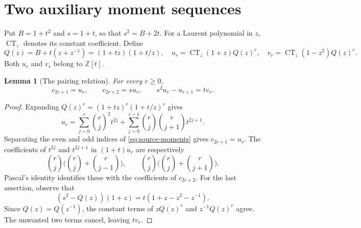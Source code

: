 \documentclass[11pt]{article}
\newtheorem{lemma}[theorem]{Lemma}
\theoremstyle{definition}
\theoremstyle{remark}
\newcommand{\Z}{\mathbb Z}
\newcommand{\CT}{\operatorname{CT}}
\theoremstyle{definition}
\theoremstyle{plain}
\numberwithin{equation}{section}
\begin{document}

\section{Two auxiliary moment sequences}
\label{sec:moments}

Put $B=1+t^2$ and $s=1+t$, so that $s^2=B+2t$.
For a Laurent polynomial in $z$, $\CT_z$ denotes its constant coefficient.
Define
\begin{equation}
 Q(z)=B+t(z+z^{-1})=(1+tz)(1+t/z),
 \quad
 u_r=\CT_z(1+z)Q(z)^r,
 \quad
 v_r=\CT_z(1-z^2)Q(z)^r.
 \label{eq:uv-ct}
\end{equation}
Both $u_r$ and $v_r$ belong to $\Z[t]$.

\begin{lemma}[The pairing relation]
\label{lem:pair}
For every $r\ge0$,
\begin{equation}
 c_{2r+1}=u_r,\qquad c_{2r+2}=s u_r,\qquad
 s^2u_r-u_{r+1}=t v_r.
 \label{eq:pair}
\end{equation}
\end{lemma}
\begin{proof}
Expanding $Q(z)^r=(1+tz)^r(1+t/z)^r$ gives
\begin{equation}
 u_r=\sum_{j=0}^r\binom rj^2t^{2j}
 +\sum_{j=0}^{r-1}\binom rj\binom r{j+1}t^{2j+1}.
 \label{eq:u-binomial}
\end{equation}
Separating the even and odd indices of
\eqref{eq:source-moments} gives $c_{2r+1}=u_r$.
The coefficients of $t^{2j}$ and $t^{2j+1}$ in $(1+t)u_r$ are respectively
\[
 \binom rj\biggl(\binom rj+\binom r{j-1}\biggr),\qquad
 \binom rj\biggl(\binom rj+\binom r{j+1}\biggr).
\]
Pascal's identity identifies these with the coefficients of $c_{2r+2}$.
For the last assertion, observe that
\[
 (s^2-Q(z))(1+z)=t(1+z-z^2-z^{-1}).
\]
Since $Q(z)=Q(z^{-1})$, the constant terms of $zQ(z)^r$ and
$z^{-1}Q(z)^r$ agree. The unwanted two terms cancel, leaving $t v_r$.
\end{proof}
\end{document}
